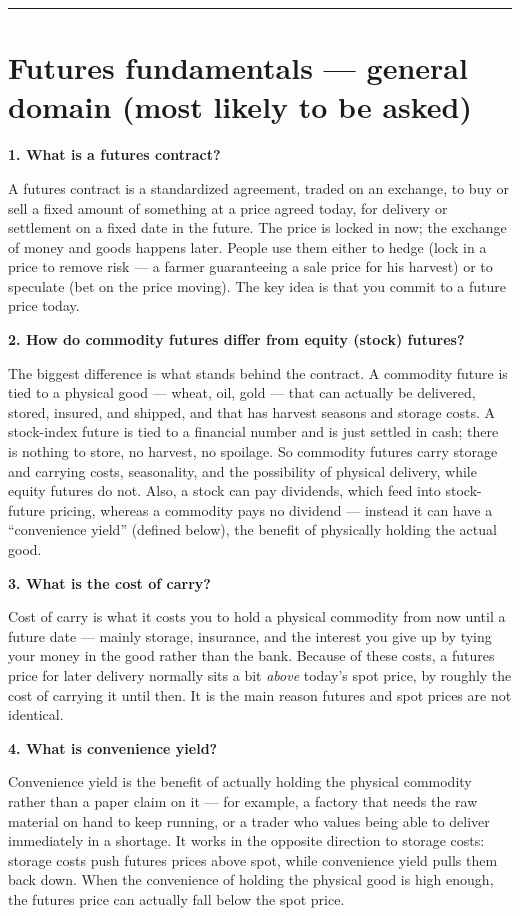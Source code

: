 \documentclass[11pt]{article}
\newcommand{\Q}[1]{\medskip\noindent\textbf{#1}\par}
\newcommand{\A}{\noindent}
\begin{document}
\bigskip
\hrule

\section{Futures fundamentals --- general domain (most likely to be asked)}

\Q{1. What is a futures contract?}
\A A futures contract is a standardized agreement, traded on an exchange, to buy or sell a fixed
amount of something at a price agreed today, for delivery or settlement on a fixed date in the
future. The price is locked in now; the exchange of money and goods happens later. People use them
either to hedge (lock in a price to remove risk --- a farmer guaranteeing a sale price for his
harvest) or to speculate (bet on the price moving). The key idea is that you commit to a future price
today.

\Q{2. How do commodity futures differ from equity (stock) futures?}
\A The biggest difference is what stands behind the contract. A commodity future is tied to a
physical good --- wheat, oil, gold --- that can actually be delivered, stored, insured, and shipped,
and that has harvest seasons and storage costs. A stock-index future is tied to a financial number
and is just settled in cash; there is nothing to store, no harvest, no spoilage. So commodity futures
carry storage and carrying costs, seasonality, and the possibility of physical delivery, while equity
futures do not. Also, a stock can pay dividends, which feed into stock-future pricing, whereas a
commodity pays no dividend --- instead it can have a ``convenience yield'' (defined below), the
benefit of physically holding the actual good.

\Q{3. What is the cost of carry?}
\A Cost of carry is what it costs you to hold a physical commodity from now until a future date ---
mainly storage, insurance, and the interest you give up by tying your money in the good rather than
the bank. Because of these costs, a futures price for later delivery normally sits a bit \emph{above}
today's spot price, by roughly the cost of carrying it until then. It is the main reason futures and
spot prices are not identical.

\Q{4. What is convenience yield?}
\A Convenience yield is the benefit of actually holding the physical commodity rather than a paper
claim on it --- for example, a factory that needs the raw material on hand to keep running, or a
trader who values being able to deliver immediately in a shortage. It works in the opposite direction
to storage costs: storage costs push futures prices above spot, while convenience yield pulls them
back down. When the convenience of holding the physical good is high enough, the futures price can
actually fall below the spot price.
\end{document}
